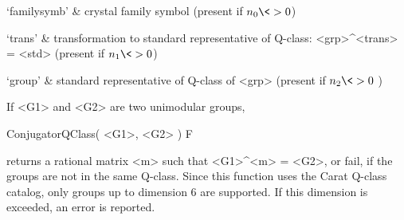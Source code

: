 `familysymb' & crystal family symbol (present if $n_{0} \<> 0$)

`trans'      & transformation to standard representative of Q-class: 
               <grp>\^{}<trans> = <std>
               (present if $n_{1} \<> 0$)

`group'      & standard representative of Q-class of <grp> 
               (present if $n_{2} \<> 0$ )
\enditems

If <G1> and <G2> are two unimodular groups,

\>ConjugatorQClass( <G1>, <G2> ) F

returns a rational matrix <m> such that <G1>\^{}<m> = <G2>, or fail, if 
the groups are not in the same Q-class. Since this function uses the 
Carat Q-class catalog, only groups up to dimension 6 are supported. 
If this dimension is exceeded, an error is reported.
